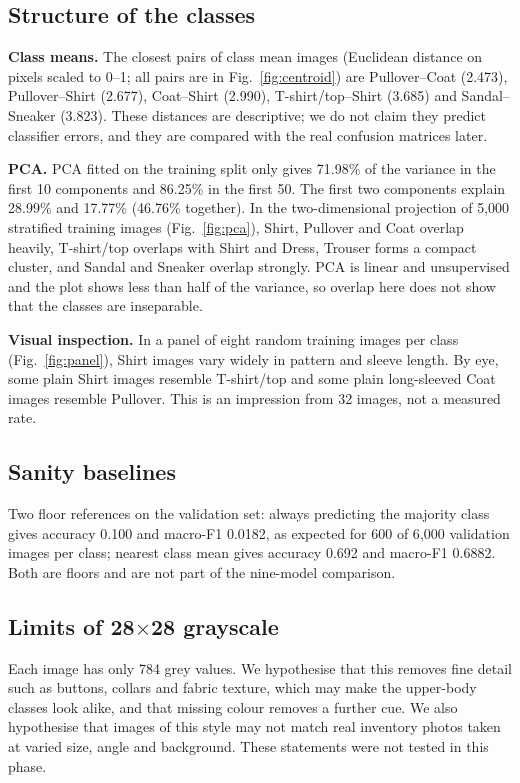 \subsection{Structure of the classes}
\textbf{Class means.} The closest pairs of class mean images (Euclidean distance on pixels scaled to 0--1; all pairs are in Fig.~\ref{fig:centroid}) are Pullover--Coat (2.473), Pullover--Shirt (2.677), Coat--Shirt (2.990), T-shirt/top--Shirt (3.685) and Sandal--Sneaker (3.823). These distances are descriptive; we do not claim they predict classifier errors, and they are compared with the real confusion matrices later.

\textbf{PCA.} PCA fitted on the training split only gives 71.98\% of the variance in the first 10 components and 86.25\% in the first 50. The first two components explain 28.99\% and 17.77\% (46.76\% together). In the two-dimensional projection of 5{,}000 stratified training images (Fig.~\ref{fig:pca}), Shirt, Pullover and Coat overlap heavily, T-shirt/top overlaps with Shirt and Dress, Trouser forms a compact cluster, and Sandal and Sneaker overlap strongly. PCA is linear and unsupervised and the plot shows less than half of the variance, so overlap here does not show that the classes are inseparable.

\textbf{Visual inspection.} In a panel of eight random training images per class (Fig.~\ref{fig:panel}), Shirt images vary widely in pattern and sleeve length. By eye, some plain Shirt images resemble T-shirt/top and some plain long-sleeved Coat images resemble Pullover. This is an impression from 32 images, not a measured rate.

\subsection{Sanity baselines}
Two floor references on the validation set: always predicting the majority class gives accuracy 0.100 and macro-F1 0.0182, as expected for 600 of 6{,}000 validation images per class; nearest class mean gives accuracy 0.692 and macro-F1 0.6882. Both are floors and are not part of the nine-model comparison.

\subsection{Limits of 28$\times$28 grayscale}
Each image has only 784 grey values. We hypothesise that this removes fine detail such as buttons, collars and fabric texture, which may make the upper-body classes look alike, and that missing colour removes a further cue. We also hypothesise that images of this style may not match real inventory photos taken at varied size, angle and background. These statements were not tested in this phase.

